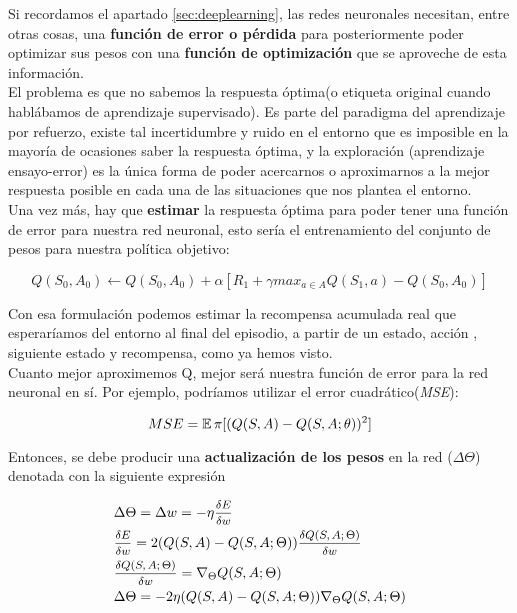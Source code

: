 \documentclass[11pt,fleqn]{book} %
\begin{document}
Si recordamos el apartado \ref{sec:deeplearning}, las redes neuronales necesitan, entre otras cosas, una \textbf{función de error o pérdida} para posteriormente poder optimizar sus pesos con una \textbf{función de optimización} que se aproveche de esta información. \\

El problema es que no sabemos la respuesta óptima(o etiqueta original cuando hablábamos de aprendizaje supervisado). Es parte del paradigma del aprendizaje por refuerzo, existe tal incertidumbre y ruido en el entorno que es imposible en la mayoría de ocasiones saber la respuesta óptima, y la exploración (aprendizaje ensayo-error) es la única forma de poder acercarnos o aproximarnos a la mejor respuesta posible en cada una de las situaciones que nos plantea el entorno. \\

Una vez más, hay que \textbf{estimar} la respuesta óptima para poder tener una función de error para nuestra red neuronal, esto sería el entrenamiento del conjunto de pesos para nuestra política objetivo:

\begin{equation*}
Q(S_0,A_0) \leftarrow Q(S_0,A_0) + \alpha \left[R_1+\gamma max_{a\in A}Q(S_1,a)-Q(S_0,A_0)\right]
\end{equation*}

Con esa formulación podemos estimar la recompensa acumulada real que esperaríamos del entorno al final del episodio, a partir de un estado, acción , siguiente estado y recompensa, como ya hemos visto. \\

Cuanto mejor aproximemos Q, mejor será nuestra función de error para la red neuronal en sí. Por ejemplo, podríamos utilizar el error cuadrático(\textit{MSE}):

\begin{equation*}
MSE= \operatorname*{\mathbb{E}}\pi[(Q(S,A)-Q(S,A;\theta))^2]
\end{equation*}

Entonces, se debe producir una \textbf{actualización de los pesos} en la red ($\Delta\Theta$) denotada con la siguiente expresión

\begin{align*}
&\Delta\Theta = \Delta w = -\eta \mfrac{\delta E}{\delta w} \\
&\mfrac{\delta E}{\delta w} = 2(Q(S,A)-Q(S,A;\Theta))\mfrac{\delta Q(S,A;\Theta)}{\delta w}\\
&\mfrac{\delta Q(S,A;\Theta)}{\delta w}=\nabla_\Theta Q(S,A;\Theta) \\
&\Delta\Theta=-2\eta(Q(S,A)-Q(S,A;\Theta))\nabla_\Theta Q(S,A;\Theta) 
\end{align*}
\end{document}
